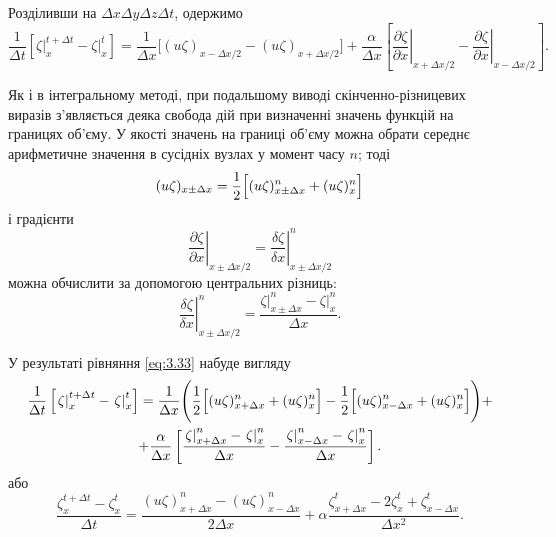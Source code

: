 Розділивши на $\Delta x \Delta y \Delta z \Delta t$, одержимо
\begin{equation}
    \label{eq:3.33}
    \frac{1}{\Delta t} \left[ \left. \zeta \right|_x^{t + \Delta t} - \left. \zeta \right|_x^t \right] = \frac{1}{\Delta x} \Big[ (u \zeta)_{x - \Delta x / 2} - (u \zeta)_{x + \Delta x / 2} \Big] + \frac{\alpha}{\Delta x} \left[ \left. \frac{\partial \zeta}{\partial x} \right|_{x + \Delta x / 2} - \left. \frac{\partial \zeta}{\partial x} \right|_{x - \Delta x / 2} \right].
\end{equation}

Як і в інтегральному методі, при подальшому виводі скінченно-різницевих виразів з'являється деяка свобода дій при визначенні значень функцій на границях об'єму. У якості значень на границі об'єму можна обрати середнє арифметичне значення в сусідніх вузлах у момент часу $n$; тоді
\begin{equation*}
    (u \zeta)_{x \pm \Delta x} = \frac{1}{2} \Big[ (u \zeta)_{x \pm \Delta x}^n + (u \zeta)_x^n \Big]
\end{equation*}
і градієнти
\begin{equation*}
    \left. \frac{\partial \zeta}{\partial x} \right|_{x \pm \Delta x / 2} = \left. \frac{\delta \zeta}{\delta x} \right|_{x \pm \Delta x / 2}^n
\end{equation*}
можна обчислити за допомогою центральних різниць:
\begin{equation*}
    \left. \frac{\delta \zeta}{\delta x} \right|_{x \pm \Delta x / 2}^n = \frac{\left. \zeta \right|_{x \pm \Delta x}^n - \left. \zeta \right|_x^n}{\Delta x}.
\end{equation*}
 
У результаті рівняння \eqref{eq:3.33} набуде вигляду
\begin{multline}
    \label{eq:3.34}
    \frac{1}{\Delta t} \left[ \left. \zeta \right|_x^{t + \Delta t} - \left. \zeta \right|_x^t \right] = \frac{1}{\Delta x} \Bigg( \frac{1}{2} \Big[ (u \zeta)_{x + \Delta x}^n + (u \zeta)_x^n \Big] - \frac{1}{2} \Big[ (u \zeta)_{x - \Delta x}^n + (u \zeta)_x^n \Big] \Bigg) + \\ + \frac{\alpha}{\Delta x} \left[ \frac{\left. \zeta \right|_{x + \Delta x}^n - \left. \zeta \right|_x^n}{\Delta x} - \frac{\left. \zeta \right|_{x - \Delta x}^n - \left. \zeta \right|_x^n}{\Delta x} \right].
\end{multline}
або
\begin{equation}
    \label{eq:3.35}
    \frac{\zeta_x^{t + \Delta t} - \zeta_x^t}{\Delta t} = \frac{(u \zeta)_{x + \Delta x}^n - (u \zeta)_{x - \Delta x}^n}{2\Delta x} + \alpha \frac{\zeta_{x + \Delta x}^t - 2 \zeta_x^t + \zeta_{x - \Delta x}^t}{\Delta x^2}.
\end{equation}

